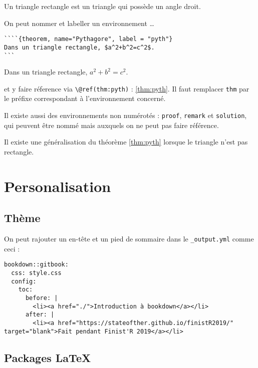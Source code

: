 \documentclass[]{book}
\theoremstyle{definition}
\theoremstyle{definition}
\theoremstyle{definition}
\theoremstyle{remark}
\let\BeginKnitrBlock\begin \let\EndKnitrBlock\end
\begin{document}
\BeginKnitrBlock{definition}
\protect\hypertarget{def:unnamed-chunk-2}{}{\label{def:unnamed-chunk-2} }Un triangle rectangle est un triangle qui possède un angle droit.
\EndKnitrBlock{definition}

On peut nommer et labeller un environnement \ldots{}

\begin{verbatim}
````{theorem, name="Pythagore", label = "pyth"}
Dans un triangle rectangle, $a^2+b^2=c^2$.
```
\end{verbatim}

\BeginKnitrBlock{theorem}[Pythagore]
\protect\hypertarget{thm:pyth}{}{\label{thm:pyth} \iffalse (Pythagore) \fi{} }Dans un triangle rectangle, \(a^2+b^2=c^2\).
\EndKnitrBlock{theorem}

et y faire réference via \texttt{\textbackslash{}@ref(thm:pyth)} : \ref{thm:pyth}. Il faut remplacer \texttt{thm} par le préfixe correspondant à l'environnement concerné.

Il existe aussi des environnements non numérotés : \texttt{proof}, \texttt{remark} et \texttt{solution}, qui peuvent être nommé mais auxquels on ne peut pas faire référence.

\BeginKnitrBlock{remark}[Al-Kashi]
\iffalse{} {Remark (Al-Kashi). } \fi{}Il existe une généralisation du théorème \ref{thm:pyth} lorsque le triangle n'est pas rectangle.
\EndKnitrBlock{remark}

\hypertarget{personalisation}{%
\chapter{Personalisation}\label{personalisation}}

\hypertarget{theme}{%
\section{Thème}\label{theme}}

On peut rajouter un en-tête et un pied de sommaire dans le \texttt{\_output.yml} comme ceci :

\begin{verbatim}
bookdown::gitbook:
  css: style.css
  config:
    toc:
      before: |
        <li><a href="./">Introduction à bookdown</a></li>
      after: |
        <li><a href="https://stateofther.github.io/finistR2019/" target="blank">Fait pendant Finist'R 2019</a></li>
\end{verbatim}

\hypertarget{packages-latex}{%
\section{Packages LaTeX}\label{packages-latex}}
\end{document}
